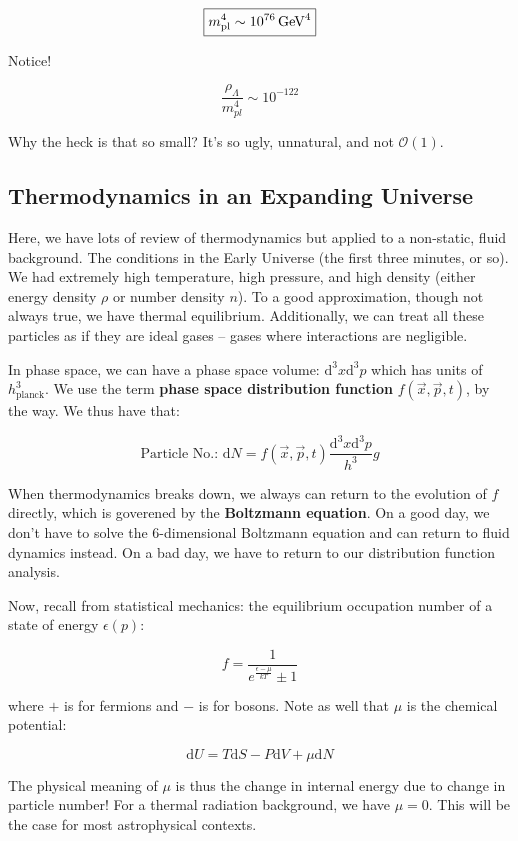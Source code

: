 \documentclass{article}
\newcommand{\unit}[1]{{\,\rm #1}}
\newcommand{\be}{\begin{equation}}
\newcommand{\ee}{\end{equation}}
\begin{document}
\be
\boxed{m_\text{pl}^4 \sim 10^{76} \unit{GeV}^4}
\ee

Notice!

\be
\frac{\rho_\Lambda}{m_{pl}^4} \sim 10^{-122}
\ee

Why the heck is that so small? It's so ugly, unnatural, and not $\mathcal{O}(1)$.


\subsection{Thermodynamics in an Expanding Universe}


Here, we have lots of review of thermodynamics but applied to a non-static, fluid background. The conditions in the Early Universe (the first three minutes, or so). We had extremely high temperature, high pressure, and high density (either energy density $\rho$ or number density $n$). To a good approximation, though not always true, we have thermal equilibrium. Additionally, we can treat all these particles as if they are ideal gases -- gases where interactions are negligible. 

In phase space, we can have a phase space volume: $\mathrm{d}^3x \mathrm{d}^3 p$ which has units of $h_\text{planck}^3$. We use the term \textbf{phase space distribution function} $f(\vec{x},\vec{p},t)$, by the way. We thus have that:

\be
\text{Particle No.: } \mathrm{d}N = f(\vec{x},\vec{p},t) \frac{\mathrm{d}^3x \mathrm{ d}^3p}{h^3} g
\ee

When thermodynamics breaks down, we always can return to the evolution of $f$ directly, which is goverened by the \textbf{Boltzmann equation}. On a good day, we don't have to solve the 6-dimensional Boltzmann equation and can return to fluid dynamics instead. On a bad day, we have to return to our distribution function analysis. 

Now, recall from statistical mechanics: the equilibrium occupation number of a state of energy $\epsilon(p)$:

\be
f = \frac{1}{e^\frac{\epsilon-\mu}{kT} \pm 1}
\ee

where $+$ is for fermions  and $-$ is for bosons. Note as well that $\mu$ is the chemical potential:

\be
\mathrm{d}U =T \mathrm{d}S - P\mathrm{d}V + \mu \mathrm{d}N
\ee

The physical meaning of $\mu$ is thus the change in internal energy due to change in particle number! For a thermal radiation background, we have $\mu = 0$. This will be the case for most astrophysical contexts. 
\end{document}
